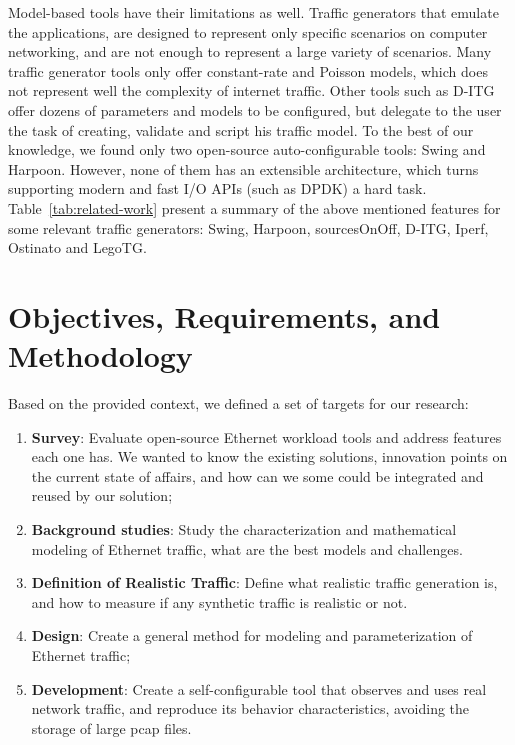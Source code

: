Model-based tools have their limitations as well. Traffic generators that emulate the applications,  are designed to represent only specific scenarios on computer networking, and are not enough to represent a large variety of scenarios. Many  traffic generator tools only offer constant-rate and Poisson models, which does not represent well the complexity of internet traffic\cite{selfsimilar-ethernet}. Other tools such as D-ITG offer dozens of parameters and models to be configured, but delegate to the user the task of creating, validate and script his traffic model. To the best of our knowledge, we found only two open-source auto-configurable tools: Swing and Harpoon.  However, none of them has an extensible architecture, which turns supporting modern and fast \acrshort{I/O} \acrshort{API}s (such as DPDK\cite{web-dpdk}) a hard task. Table~\ref{tab:related-work} present a summary of the above mentioned features for some relevant traffic generators: Swing\cite{swing-paper}, Harpoon\cite{harpoon-validation}, sourcesOnOff\cite{sourcesonoff-paper}, D-ITG\cite{ditg-paper}, Iperf\cite{web-iperf}, Ostinato\cite{web-ostinato} and LegoTG\cite{legotg-paper}.


\section{Objectives, Requirements, and Methodology}


Based on the provided context, we defined a set of targets for our research:


\begin{enumerate}

	\item \textbf{Survey}: Evaluate open-source Ethernet workload tools and address features each one has. We wanted to know the existing solutions, innovation points on the current state of affairs, and how can we some could be integrated and reused by our solution;
	
	\item \textbf{Background studies}: Study the characterization and mathematical modeling of Ethernet traffic, what are the best models and challenges. 
	
	\item \textbf{Definition of Realistic Traffic}: Define what realistic traffic generation is, and how to measure if any synthetic traffic is realistic or not. 
	
	\item \textbf{Design}: Create a general method for modeling and parameterization of Ethernet traffic;
	
	\item \textbf{Development}:  Create a self-configurable tool that observes and uses real network traffic, and reproduce its behavior characteristics, avoiding the storage of large pcap files. 
	
\end{enumerate}

